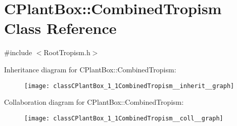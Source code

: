 \hypertarget{classCPlantBox_1_1CombinedTropism}{}\section{C\+Plant\+Box\+:\+:Combined\+Tropism Class Reference}
\label{classCPlantBox_1_1CombinedTropism}


{\ttfamily \#include $<$Root\+Tropism.\+h$>$}



Inheritance diagram for C\+Plant\+Box\+:\+:Combined\+Tropism\+:\nopagebreak
\begin{figure}[H]
\begin{center}
\leavevmode
\texttt{[image: classCPlantBox\_1\_1CombinedTropism\_\_inherit\_\_graph]}
\end{center}
\end{figure}


Collaboration diagram for C\+Plant\+Box\+:\+:Combined\+Tropism\+:\nopagebreak
\begin{figure}[H]
\begin{center}
\leavevmode
\texttt{[image: classCPlantBox\_1\_1CombinedTropism\_\_coll\_\_graph]}
\end{center}
\end{figure}

